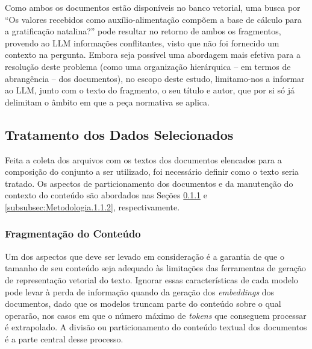 Como ambos os documentos estão disponíveis no banco vetorial, uma busca por ``Os valores recebidos como auxílio-alimentação compõem a base de cálculo para a gratificação natalina?'' pode resultar no retorno de ambos os fragmentos, provendo ao \ac{LLM} informações conflitantes, visto que não foi fornecido um contexto na pergunta. Embora seja possível uma abordagem mais efetiva para a resolução deste problema (como uma organização hierárquica -- em termos de abrangência -- dos documentos), no escopo deste estudo, limitamo-nos a informar ao \ac{LLM}, junto com o texto do fragmento, o seu título e autor, que por si só já delimitam o âmbito em que a peça normativa se aplica.

\subsection{Tratamento dos Dados Selecionados}
\label{subsec:Metodologia.1.1}

Feita a coleta dos arquivos com os textos dos documentos elencados para a composição do conjunto a ser utilizado, foi necessário definir como o texto seria tratado. Os aspectos de particionamento dos documentos e da manutenção do contexto do conteúdo são abordados nas Seções \ref{subsubsec:Metodologia.1.1.1} e \ref{subsubsec:Metodologia.1.1.2}, respectivamente.

\subsubsection{Fragmentação do Conteúdo}
\label{subsubsec:Metodologia.1.1.1}

Um dos aspectos que deve ser levado em consideração é a garantia de que o tamanho de seu conteúdo seja adequado às limitações das ferramentas de geração de representação vetorial do texto. Ignorar essas características de cada modelo pode levar à perda de informação quando da geração dos \textit{embeddings} dos documentos, dado que os modelos truncam parte do conteúdo sobre o qual operarão, nos casos em que o número máximo de \textit{tokens} que conseguem processar é extrapolado. A divisão ou particionamento do conteúdo textual dos documentos é a parte central desse processo.

